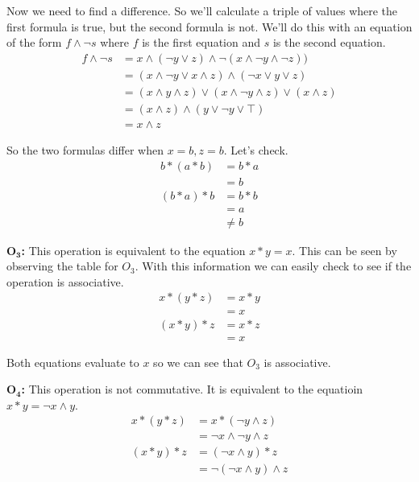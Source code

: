 \documentclass[twoside]{amsart}
\begin{document}
\begin{enumerate}[label=\textbf{\arabic*}, leftmargin=1em]
   Now we need to find a difference. So we'll calculate a triple of
   values where the first formula is true, but the second formula is not.
   We'll do this with an equation of the form $f \land \lnot s$ where $f$
   is the first equation and $s$ is the second equation.
%
   \begin{align*}
      f \land \lnot s & = x \land (\lnot y \lor z) \land \lnot 
                       (x \land \lnot y \land \lnot z))\\
         & = (x \land \lnot y \lor x \land z) \land 
	     (\lnot x \lor y \lor z) \\
	 & = (x \land y \land z) \lor (x \land \lnot y \land z) 
	      \lor (x \land z) \\
	 & = (x \land z) \land (y \lor \lnot y \lor \top) \\
	 & = x \land z
   \end{align*}

   So the two formulas differ when $x = b, z = b$. Let's check.
%
   \begin{align*}
       b * (a * b) & = b * a \\
                   & = b \\
       (b * a) * b & = b * b \\
                   & = a     \\
		   & \ne b
   \end{align*}

   $\mathbf{O_3}$\textbf{:} This operation is equivalent to the
   equation $x * y = x$. This can be seen by observing the table for
   $O_3$. With this information we can easily check to see if the
   operation is associative.
%
   \begin{align*}
      x * (y * z) & = x * y \\
                  & = x     \\
      (x * y) * z & = x * z \\
                  & = x
   \end{align*}

   Both equations evaluate to $x$ so we can see that $O_3$ is
   associative. 

   $\mathbf{O_4}$\textbf{:} This operation is not commutative. It is 
   equivalent to the equatioin $x * y = \lnot x \land y$.
%
   \begin{align*}
      x * (y * z) & = x * (\lnot y \land z)    \\
                  & = \lnot x \land \lnot y \land z \\
      (x * y) * z & = (\lnot x \land y) * z \\
                  & = \lnot (\lnot x \land y) \land z
   \end{align*}


\end{enumerate}
\end{document}
